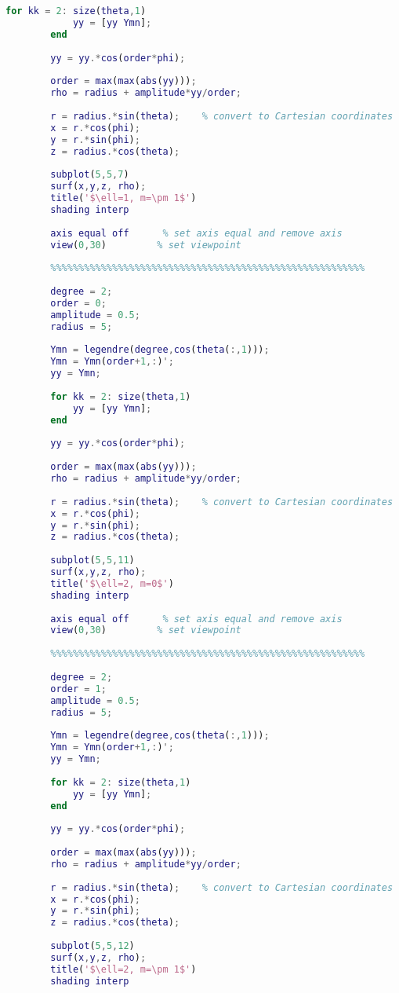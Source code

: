 \begin{lstlisting}[language=MATLAB]
		for kk = 2: size(theta,1)
		    yy = [yy Ymn];
		end
		
		yy = yy.*cos(order*phi);
		
		order = max(max(abs(yy)));
		rho = radius + amplitude*yy/order;
		
		r = radius.*sin(theta);    % convert to Cartesian coordinates
		x = r.*cos(phi);
		y = r.*sin(phi);
		z = radius.*cos(theta);
		
		subplot(5,5,7)
		surf(x,y,z, rho);
		title('$\ell=1, m=\pm 1$')
		shading interp
		
		axis equal off      % set axis equal and remove axis
		view(0,30)         % set viewpoint
		
		%%%%%%%%%%%%%%%%%%%%%%%%%%%%%%%%%%%%%%%%%%%%%%%%%%%%%%%%
		
		degree = 2;
		order = 0;
		amplitude = 0.5;
		radius = 5;
		
		Ymn = legendre(degree,cos(theta(:,1)));
		Ymn = Ymn(order+1,:)';
		yy = Ymn;
		
		for kk = 2: size(theta,1)
		    yy = [yy Ymn];
		end
		
		yy = yy.*cos(order*phi);
		
		order = max(max(abs(yy)));
		rho = radius + amplitude*yy/order;
		
		r = radius.*sin(theta);    % convert to Cartesian coordinates
		x = r.*cos(phi);
		y = r.*sin(phi);
		z = radius.*cos(theta);
		
		subplot(5,5,11)
		surf(x,y,z, rho);
		title('$\ell=2, m=0$')
		shading interp
		
		axis equal off      % set axis equal and remove axis
		view(0,30)         % set viewpoint
		
		%%%%%%%%%%%%%%%%%%%%%%%%%%%%%%%%%%%%%%%%%%%%%%%%%%%%%%%%
		
		degree = 2;
		order = 1;
		amplitude = 0.5;
		radius = 5;
		
		Ymn = legendre(degree,cos(theta(:,1)));
		Ymn = Ymn(order+1,:)';
		yy = Ymn;
		
		for kk = 2: size(theta,1)
		    yy = [yy Ymn];
		end
		
		yy = yy.*cos(order*phi);
		
		order = max(max(abs(yy)));
		rho = radius + amplitude*yy/order;
		
		r = radius.*sin(theta);    % convert to Cartesian coordinates
		x = r.*cos(phi);
		y = r.*sin(phi);
		z = radius.*cos(theta);
		
		subplot(5,5,12)
		surf(x,y,z, rho);
		title('$\ell=2, m=\pm 1$')
		shading interp
		

\end{lstlisting}
